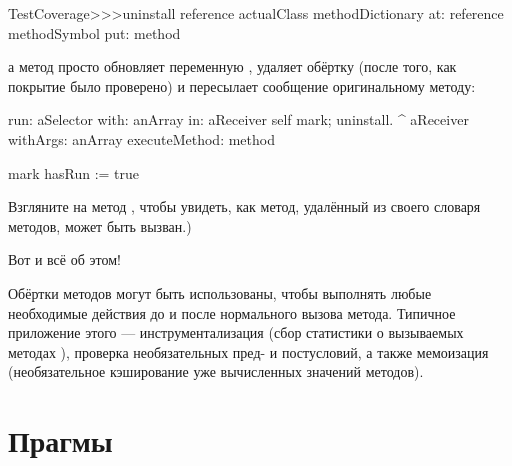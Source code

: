 \documentclass[a4paper,10pt,twoside]{book}
\begin{document}
{\begin{code}{}
TestCoverage>>>uninstall
	reference actualClass methodDictionary
		at: reference methodSymbol
		put: method
\end{code}
\noindent
а метод  просто обновляет переменную , удаляет обёртку (после того, как покрытие было проверено) и пересылает сообщение оригинальному методу:
\begin{code}{}
run: aSelector with: anArray in: aReceiver
	self mark; uninstall.
	^ aReceiver withArgs: anArray executeMethod: method

mark
	hasRun := true
\end{code}
Взгляните на метод , чтобы увидеть, как метод, удалённый из своего словаря методов, может быть вызван.)

Вот и всё об этом!

Обёртки методов могут быть использованы, чтобы выполнять любые необходимые действия до и после нормального вызова метода. Типичное приложение этого --- инструментализация (сбор статистики о вызываемых методах ), проверка необязательных пред- и постусловий, а также мемоизация (необязательное кэширование уже вычисленных значений методов). 

\section{Прагмы}

}
\end{document}
